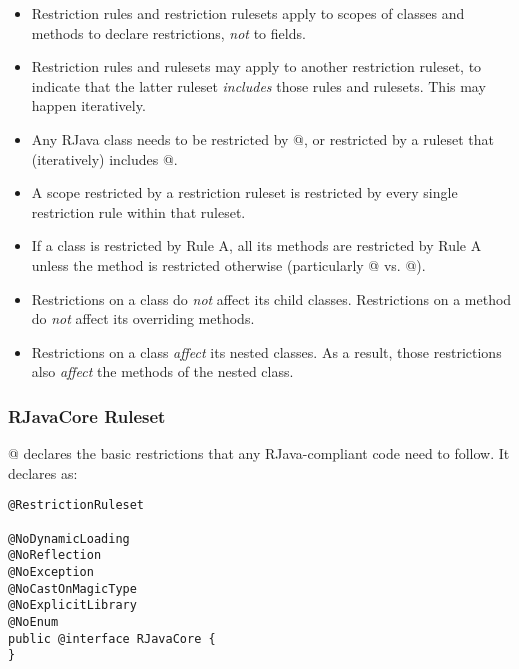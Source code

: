 \documentclass[12pt]{article}
\begin{document}
\begin{itemize}

\item 
Restriction rules and restriction rulesets apply to scopes of
classes and methods to declare restrictions, \emph{not} to fields. 
\item
Restriction rules and rulesets may apply to another restriction ruleset,
to indicate that the latter ruleset \emph{includes} those rules and rulesets.
This may happen iteratively. 
\item
Any RJava class needs to be restricted by @, or restricted
by a ruleset that (iteratively) includes @.
\item
A scope restricted by a restriction ruleset is restricted by every single
restriction rule within that ruleset. 
\item
If a class is restricted by Rule A, all its methods are restricted by Rule A 
unless the method is restricted otherwise 
(particularly @ vs. @). 
\item
Restrictions on a class do \emph{not} affect its child classes. Restrictions on a method
do \emph{not} affect its overriding methods. 
\item
Restrictions on a class \emph{affect} its nested classes. As a result, 
those restrictions also \emph{affect} the methods of the nested class. 

\end{itemize}

\subsubsection{RJavaCore Ruleset}

@ declares the basic restrictions that any RJava-compliant code
need to follow. It declares as:

\begin{lstlisting}
@RestrictionRuleset

@NoDynamicLoading
@NoReflection
@NoException
@NoCastOnMagicType
@NoExplicitLibrary
@NoEnum
public @interface RJavaCore {
}
\end{lstlisting}
\end{document}
